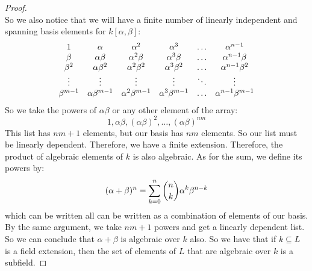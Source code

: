 \documentclass{article}
\begin{document}
\begin{itemize}
\begin{proof}
\begin{equation*}
                    \end{equation*}
                So we also notice that we will have a finite number of linearly independent and spanning basis elements for $k[\alpha, \beta]$:
                    \begin{align*}
                        \begin{array}{ c c c c c c }
                            1             & \alpha              & \alpha^{2}              & \alpha^{3}              & \ldots  & \alpha^{n - 1}              \\
                            \beta         & \alpha\beta         & \alpha^{2}\beta         & \alpha^{3}\beta         & \ldots  & \alpha^{n - 1}\beta         \\
                            \beta^{2}     & \alpha\beta^{2}     & \alpha^{2}\beta^{2}     & \alpha^{3}\beta^{2}     & \ldots  & \alpha^{n - 1}\beta^{2}     \\
                            \vdots        & \vdots              & \vdots                  & \vdots                  & \ddots  & \vdots                      \\
                            \beta^{m - 1} & \alpha\beta^{m - 1} & \alpha^{2}\beta^{m - 1} & \alpha^{3}\beta^{m - 1} & \ldots  & \alpha^{n - 1}\beta^{m - 1}   
                        \end{array}
                    \end{align*}
                So we take the powers of $\alpha\beta$ or any other element of the array:
                    \begin{equation*}
                        1, \alpha\beta, (\alpha\beta)^{2}, \ldots , (\alpha\beta)^{nm}
                    \end{equation*}
                This list has $nm + 1$ elements, but our basis has $nm$ elements. So our list must be linearly dependent. Therefore, we have a finite extension. Therefore, the product of algebraic elements of $k$ is also algebraic. As for the sum, we define its powers by:
                    \begin{equation*}
                        (\alpha + \beta)^{n} = \sum_{k = 0}^{n} \dbinom{n}{k}\alpha^{k}\beta^{n - k}
                    \end{equation*}
                which can be written all can be written as a combination of elements of our basis. By the same argument, we take $nm + 1$ powers and get a linearly dependent list. So we can conclude that $\alpha + \beta$ is algebraic over $k$ also. So we have that if $k \subseteq L$ is a field extension, then the set of elements of $L$ that are algebraic over $k$ is a subfield.
            \end{proof}


\end{itemize}
\end{document}
